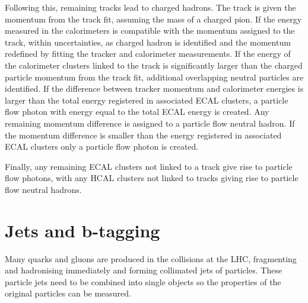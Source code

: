 Following this, remaining tracks lead to charged hadrons. The track is
given the momentum from the track fit, assuming the mass of a charged pion. If
the energy measured in the calorimeters is compatible with the momentum assigned
to the track, within uncertainties, as charged hadron is identified and the
momentum redefined by fitting the tracker and calorimeter measurements. If
the energy of the calorimeter clusters linked to the track is significantly larger than the
charged particle momentum from the track fit, additional overlapping neutral particles
are identified. If the difference between tracker momentum and calorimeter
energies is larger than the total energy registered in associated \ac{ECAL} clusters,
a particle flow photon with energy equal to the total \ac{ECAL} energy is created.
Any remaining momentum difference is assigned to a particle flow neutral hadron. If the momentum
difference is smaller than the energy registered in associated \ac{ECAL} clusters 
only a particle flow photon is created. %

Finally, any remaining \ac{ECAL} clusters not linked to a track give
rise to particle flow photons, with any \ac{HCAL} clusters
not linked to tracks giving rise to particle flow neutral hadrons.

\section{Jets and b-tagging}
\label{sec:objects_jets}
Many quarks and gluons are produced in the collisions at the \ac{LHC},
fragmenting and hadronising immediately and forming collimated
jets of particles. These particle jets need to be combined
into single objects so the properties of the original particles can
be measured.


